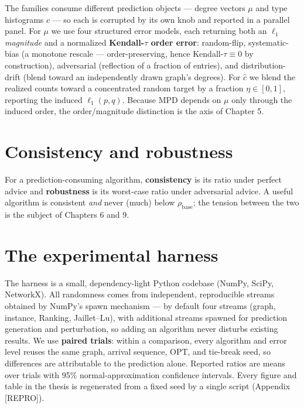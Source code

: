 The families consume different prediction objects --- degree vectors \(\mu\) and type
histograms \(\hat c\) --- so each is corrupted by its own knob and reported in a parallel panel.
For \(\mu\) we use four structured error models, each returning both an \(\ell_1\) \emph{magnitude}
and a normalized \textbf{Kendall-\(\tau\) order error}: random-flip, systematic-bias (a monotone
rescale --- order-preserving, hence Kendall-\(\tau\equiv0\) by construction), adversarial
(reflection of a fraction of entries), and distribution-drift (blend toward an
independently drawn graph's degrees). For \(\hat c\) we blend the realized counts toward a
concentrated random target by a fraction \(\eta\in[0,1]\), reporting the induced
\(\ell_1(p,q)\). Because MPD depends on \(\mu\) only through the induced order, the
order/magnitude distinction is the axis of Chapter 5.

\section{Consistency and robustness}\label{consistency-and-robustness}

For a prediction-consuming algorithm, \textbf{consistency} is its ratio under perfect advice and
\textbf{robustness} is its worst-case ratio under adversarial advice. A useful algorithm is
consistent \emph{and} never (much) below \(\rho_{\mathrm{base}}\); the tension between the two is
the subject of Chapters 6 and 9.

\section{The experimental harness}\label{the-experimental-harness}

The harness is a small, dependency-light Python codebase (NumPy, SciPy, NetworkX). All
randomness comes from independent, reproducible streams obtained by NumPy's spawn mechanism
--- by default four streams (graph, instance, Ranking, Jaillet--Lu), with additional streams
spawned for prediction generation and perturbation, so adding an algorithm never disturbs
existing results. We use \textbf{paired trials}: within a comparison, every algorithm and error
level reuses the same graph, arrival sequence, \(\mathrm{OPT}\), and tie-break seed, so
differences are attributable to the prediction alone. Reported ratios are means over trials
with 95\% normal-approximation confidence intervals. Every figure and table in the thesis is
regenerated from a fixed seed by a single script (Appendix {[}REPRO{]}).

